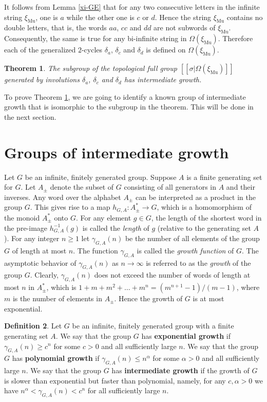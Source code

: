 \documentclass[12pt]{article}
\newtheorem{theorem}{Theorem}[section]
\theoremstyle{definition}
\newtheorem{definition}[theorem]{Definition}
\def\ga{\gamma}
\def\de{\delta}
\def\si{\sigma}
\def\Om{\Omega}
\def\xiGE{\xi_{\mathrm{Mu}}}
\begin{document}
It follows from Lemma \ref{xi-GE} that for any two consecutive letters in 
the infinite string $\xiGE$, one is $a$ while the other one is $c$ or $d$.  
Hence the string $\xiGE$ contains no double letters, that is, the words 
$aa$, $cc$ and $dd$ are not subwords of $\xiGE$.  Consequently, the same is 
true for any bi-infinite string in $\Om(\xiGE)$.  Therefore each of the 
generalized $2$-cycles $\de_a$, $\de_c$ and $\de_d$ is defined on 
$\Om(\xiGE)$.

\begin{theorem}\label{sub-main}
The subgroup of the topological full group $[[\si|\Omega(\xiGE)]]$ 
generated by involutions $\de_a$, $\de_c$ and $\de_d$ has intermediate 
growth.
\end{theorem}

To prove Theorem \ref{sub-main}, we are going to identify a known group of 
intermediate growth that is isomorphic to the subgroup in the theorem.  
This will be done in the next section.

%
\section{Groups of intermediate growth}\label{sect-growth}

Let $G$ be an infinite, finitely generated group.  Suppose $A$ is a finite 
generating set for $G$.  Let $A_\pm$ denote the subset of $G$ consisting of 
all generators in $A$ and their inverses.  Any word over the alphabet 
$A_\pm$ can be interpreted as a product in the group $G$.  This gives rise 
to a map $h_{G,A}:A_\pm^*\to G$, which is a homomorphism of the monoid 
$A_\pm^*$ onto $G$.  For any element $g\in G$, the length of the shortest 
word in the pre-image $h_{G,A}^{-1}(g)$ is called the \emph{length} of $g$ 
(relative to the generating set $A$).  For any integer $n\ge1$ let 
$\ga_{G,A}(n)$ be the number of all elements of the group $G$ of length at 
most $n$.  The function $\ga_{G,A}$ is called the \emph{growth function} of 
$G$.  The asymptotic behavior of $\ga_{G,A}(n)$ as $n\to\infty$ is referred 
to as the \emph{growth} of the group $G$.  Clearly, $\ga_{G,A}(n)$ does not 
exceed the number of words of length at most $n$ in $A_\pm^*$, which is 
$1+m+m^2+\dots+m^n=(m^{n+1}-1)/(m-1)$, where $m$ is the number of elements 
in $A_\pm$.  Hence the growth of $G$ is at most exponential.

\begin{definition}\label{def-growth}
Let $G$ be an infinite, finitely generated group with a finite generating 
set $A$.  We say that the group $G$ has \textbf{exponential growth} if 
$\ga_{G,A}(n)\ge c^n$ for some $c>0$ and all sufficiently large $n$.  We 
say that the group $G$ has \textbf{polynomial growth} if $\ga_{G,A}(n)\le 
n^\alpha$ for some $\alpha>0$ and all sufficiently large $n$.  We say that 
the group $G$ has \textbf{intermediate growth} if the growth of $G$ is 
slower than exponential but faster than polynomial, namely, for any 
$c,\alpha>0$ we have $n^\alpha<\ga_{G,A}(n)<c^n$ for all sufficiently large 
$n$.
\end{definition}
\end{document}
